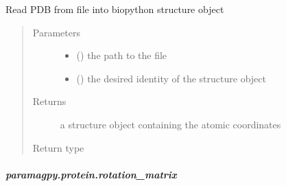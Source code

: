 \documentclass[a4paper,10pt,english]{sphinxmanual}
\begin{document}
\begin{fulllineitems}
\label{\detokenize{reference/generated/paramagpy.protein.load_pdb:paramagpy.protein.load_pdb}}
Read PDB from file into biopython structure object
\begin{quote}\begin{description}
\item[{Parameters}] \leavevmode\begin{itemize}
\item {} 
 () \textendash{} the path to the file

\item {} 
 (\sphinxstyleliteralemphasis{\sphinxupquote{ (}}\sphinxstyleliteralemphasis{\sphinxupquote{)}}) \textendash{} the desired identity of the structure object

\end{itemize}

\item[{Returns}] \leavevmode
{} \textendash{} a structure object containing the atomic coordinates

\item[{Return type}] \leavevmode
{\hyperref[\detokenize{reference/generated/paramagpy.protein.CustomStructure:paramagpy.protein.CustomStructure}]{}}

\end{description}\end{quote}

\end{fulllineitems}



\subparagraph{paramagpy.protein.rotation\_matrix}
\label{\detokenize{reference/generated/paramagpy.protein.rotation_matrix:paramagpy-protein-rotation-matrix}}\label{\detokenize{reference/generated/paramagpy.protein.rotation_matrix::doc}}
\end{document}
